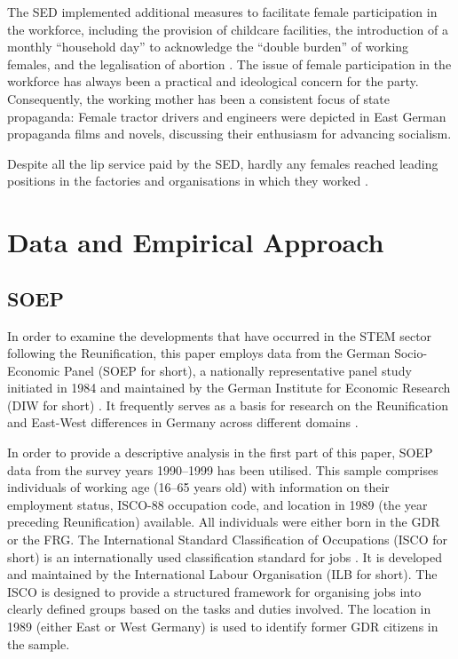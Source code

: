 \documentclass[a4paper, oneside, hyperfootnotes = false]{article}
\begin{document}
{%
The SED implemented additional measures to facilitate female participation in the workforce, including the provision of childcare facilities, the introduction of a monthly ``household day'' to acknowledge the ``double burden'' of working females, and the legalisation of abortion \citep{Budde1999}.
The issue of female participation in the workforce has always been a practical and ideological concern for the party.
Consequently, the working mother has been a consistent focus of state propaganda:
Female tractor drivers and engineers were depicted in East German propaganda films and novels, discussing their enthusiasm for advancing socialism.

Despite all the lip service paid by the SED, hardly any females reached leading positions in the factories and organisations in which they worked \citep{Ross2017, Frauenreport1990}.

\section{Data and Empirical Approach}
\label{dataemp}

\subsection{SOEP}
\label{gsoep}

In order to examine the developments that have occurred in the STEM sector following the Reunification, this paper employs data from the German Socio-Economic Panel (SOEP for short), a nationally representative panel study initiated in 1984 and maintained by the German Institute for Economic Research (DIW for short) \citep{Siegers2022}.
It frequently serves as a basis for research on the Reunification and East-West differences in Germany across different domains \citep{Petrunyk2016, Bird1994, Hadjar2010}.

In order to provide a descriptive analysis in the first part of this paper, SOEP data from the survey years 1990–1999 has been utilised.
This sample comprises individuals of working age (16–65 years old) with information on their employment status, ISCO-88 occupation code, and location in 1989 (the year preceding Reunification) available.
All individuals were either born in the GDR or the FRG.
The International Standard Classification of Occupations (ISCO for short) is an internationally used classification standard for jobs \citep{Elias1997}.
It is developed and maintained by the International Labour Organisation (ILB for short).
The ISCO is designed to provide a structured framework for organising jobs into clearly defined groups based on the tasks and duties involved.
The location in 1989 (either East or West Germany) is used to identify former GDR citizens in the sample.

}
\end{document}

